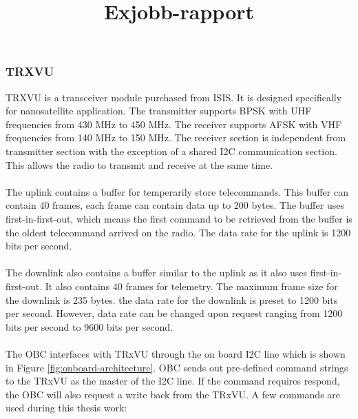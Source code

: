 \documentclass[a4paper]{article}
\title{Exjobb-rapport}
\begin{document}

\subsubsection{TRXVU}
TRXVU is a transceiver module purchased from ISIS. It is designed specifically for nanosatellite application. The transmitter supports BPSK with UHF frequencies from 430 MHz to 450 MHz. The receiver supports AFSK with VHF frequencies from 140 MHz to 150 MHz. The receiver section is independent from transmitter section with the exception of a shared I2C communication section. This allows the radio to transmit and receive at the same time. \\\\
\indent The uplink contains a buffer for temperarily store telecommands. This buffer can contain 40 frames, each frame can contain data up to 200 bytes. The buffer uses first-in-first-out, which means the first command to be retrieved from the buffer is the oldest telecommand arrived on the radio. The data rate for the uplink is 1200 bits per second. \\ \\
\indent The downlink also contains a buffer similar to the uplink as it also uses first-in-first-out. It also contains 40 frames for telemetry. The maximum frame size for the downlink is 235 bytes. the data rate for the downlink is preset to 1200 bits per second. However, data rate can be changed upon request ranging from 1200 bits per second to 9600 bits per second.   \\ \\
\indent The OBC interfaces with TRxVU through the on board I2C line which is shown in Figure \ref{fig:onboard-architecture}. OBC sends out pre-defined command strings to the TRxVU as the master of the I2C line. If the command requires respond, the OBC will also request a write back from the TRxVU. A few commands are used during this thesis work:
\end{document}
